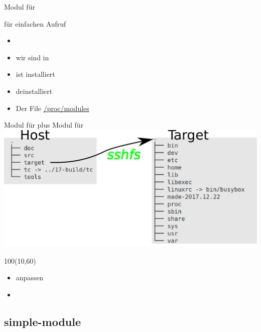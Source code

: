 \begin{frame}{Modul für \host}
 \begin{description}[Makefile]
  \item[Code]     
  \item[Script]    für einfachen Aufruf
  \item[Test]
      \begin{itemize}
	\item {}
        \item {} wir sind in  
	\item {} ist installiert
	\item {} deinstalliert
	\item Der File \url{/proc/modules}
      \end{itemize}
 \end{description}
\end{frame}

\begin{frame}{Modul für \targetS}{plus Modul für \host}
 \includegraphics[width=\textwidth]{host-target.pdf}
 \begin{textblock}{100}(10,60)
  \begin{itemize}
   \item {} anpassen
   \item {}
  \end{itemize}
 \end{textblock}
\end{frame}


\subsection{simple-module}


%


